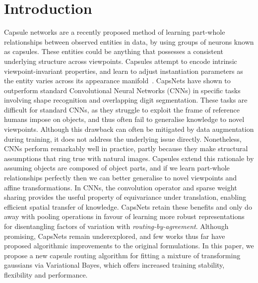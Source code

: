 \documentclass[letterpaper]{article} \usepackage{aaai20}  \usepackage{times}  \usepackage{helvet} \usepackage{courier}  \usepackage[hyphens]{url}  \usepackage{graphicx} \urlstyle{rm} \def\UrlFont{\rm}  \usepackage{graphicx}  \frenchspacing  \setlength{\pdfpagewidth}{8.5in}  \setlength{\pdfpageheight}{11in}  \nocopyright
\begin{document}
\section{Introduction}
Capsule networks are a recently proposed method of learning part-whole relationships between observed entities in data, by using groups of neurons known as capsules. These entities could be anything that possesses a consistent underlying structure across viewpoints. Capsules attempt to encode intrinsic viewpoint-invariant properties, and learn to adjust instantiation parameters as the entity varies across its appearance manifold~\cite{hinton2011transforming}. CapsNets have shown to outperform standard Convolutional Neural Networks (CNNs) in specific tasks involving shape recognition and overlapping digit segmentation. These tasks are difficult for standard CNNs, as they struggle to exploit the frame of reference humans impose on objects, and thus often fail to generalise knowledge to novel viewpoints. Although this drawback can often be mitigated by data augmentation during training, it does not address the underlying issue directly. Nonetheless, CNNs perform remarkably well in practice, partly because they make structural assumptions that ring true with natural images. Capsules extend this rationale by assuming objects are composed of object parts, and if we learn part-whole relationships perfectly then we can better generalise to novel viewpoints and affine transformations. In CNNs, the convolution operator and sparse weight sharing provides the useful property of equivariance under translation, enabling efficient spatial transfer of knowledge. CapsNets retain these benefits and only do away with pooling operations in favour of learning more robust representations for disentangling factors of variation with \textit{routing-by-agreement}. Although promising, CapsNets remain underexplored, and few works thus far have proposed algorithmic improvements to the original formulations. In this paper, we propose a new capsule routing algorithm for fitting a mixture of transforming gaussians via Variational Bayes, which offers increased training stability, flexibility and performance. 
\end{document}
